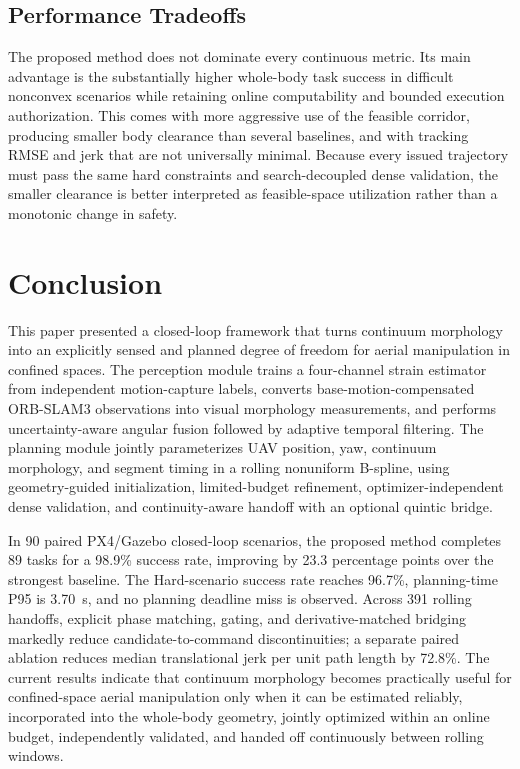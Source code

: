 \documentclass[journal,twoside]{IEEEtran}
\begin{document}
\subsection{Performance Tradeoffs}
The proposed method does not dominate every continuous metric. Its main advantage is the substantially higher whole-body task success in difficult nonconvex scenarios while retaining online computability and bounded execution authorization. This comes with more aggressive use of the feasible corridor, producing smaller body clearance than several baselines, and with tracking RMSE and jerk that are not universally minimal. Because every issued trajectory must pass the same hard constraints and search-decoupled dense validation, the smaller clearance is better interpreted as feasible-space utilization rather than a monotonic change in safety.

\section{Conclusion}
This paper presented a closed-loop framework that turns continuum morphology into an explicitly sensed and planned degree of freedom for aerial manipulation in confined spaces. The perception module trains a four-channel strain estimator from independent motion-capture labels, converts base-motion-compensated ORB-SLAM3 observations into visual morphology measurements, and performs uncertainty-aware angular fusion followed by adaptive temporal filtering. The planning module jointly parameterizes UAV position, yaw, continuum morphology, and segment timing in a rolling nonuniform B-spline, using geometry-guided initialization, limited-budget refinement, optimizer-independent dense validation, and continuity-aware handoff with an optional quintic bridge.

In 90 paired PX4/Gazebo closed-loop scenarios, the proposed method completes 89 tasks for a 98.9\% success rate, improving by 23.3 percentage points over the strongest baseline. The Hard-scenario success rate reaches 96.7\%, planning-time P95 is 3.70~s, and no planning deadline miss is observed. Across 391 rolling handoffs, explicit phase matching, gating, and derivative-matched bridging markedly reduce candidate-to-command discontinuities; a separate paired ablation reduces median translational jerk per unit path length by 72.8\%. The current results indicate that continuum morphology becomes practically useful for confined-space aerial manipulation only when it can be estimated reliably, incorporated into the whole-body geometry, jointly optimized within an online budget, independently validated, and handed off continuously between rolling windows.
\end{document}
